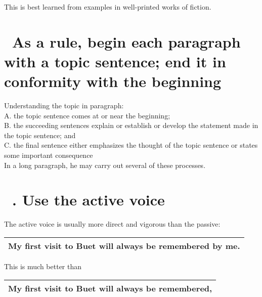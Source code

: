 \documentclass[10pt]{report}
\begin{document}
This is best learned from examples in well-printed
works of fiction.

 \section {\bfseries \ As a rule, begin each paragraph with a topic sentence; end it in
conformity with the beginning}

Understanding the topic in paragraph:\\
\noindent
A. the topic sentence comes at or near the beginning;\\
B. the succeeding sentences explain or establish or develop the statement
made in the topic sentence; and\\
C. the final sentence either emphasizes the thought of the topic sentence or
states some important consequence\\



In a long paragraph, he may carry out several of these processes.\\


\newpage





\section {\bfseries \ . Use the active voice}

The active voice is usually more direct and vigorous than the passive:

\begin{table}[!tbh]
    \centering
        \begin{tabular}{|l|}
        \hline
       My first visit to Buet will always be remembered
by me.\\
       \hline


       
        

 \end{tabular}
 \end{table} 
 
 This is much better than
 
\begin{table}[!tbh]
    \centering
        \begin{tabular}{|l|}
        \hline
       My first visit to Buet will always be remembered,\\
       \hline


       
        

 \end{tabular}
 \end{table} 
 
\end{document}
